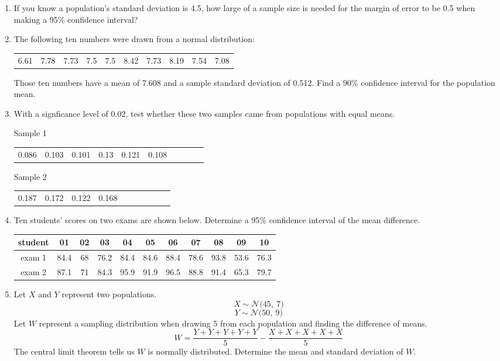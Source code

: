 \documentclass[12pt,letterpaper]{article}
\newcommand{\N}[2]{\mathcal{N}\big(#1,~#2\big)}
\begin{document}
\begin{enumerate}
\item If you know a population's standard deviation is 4.5, how large of a sample size is needed for the margin of error to be 0.5 when making a 95\% confidence interval?
\vfill
\item The following ten numbers were drawn from a normal distribution:
\begin{center}
\begin{tabular}{cccccccccc}
6.61 & 7.78 & 7.73 & 7.5 & 7.5 & 8.42 & 7.73 & 8.19 & 7.54 & 7.08
\end{tabular}
\end{center}
Those ten numbers have a mean of 7.608 and a sample standard deviation of 0.512. Find a 90\% confidence interval for the population mean.
\vfill

\newpage

\item With a signficance level of 0.02, test whether these two samples came from populations with equal means.
\begin{center}
Sample 1\\
\begin{tabular}{cccccccccc}
0.086 & 0.103 & 0.101 & 0.13 & 0.121 & 0.108
\end{tabular}
\end{center}
\begin{center}
Sample 2\\
\begin{tabular}{cccccccccc}
0.187 & 0.172 & 0.122 & 0.168
\end{tabular}
\end{center}

\newpage

\item Ten students' scores on two exams are shown below. Determine a 95\% confidence interval of the mean difference.
\begin{center}
\begin{tabular}{|c|c c c c c c c c c c|} \hline
student & 01 & 02 & 03 & 04 & 05 & 06 & 07 & 08 & 09 & 10 \\ \hline
exam 1 & 84.4 & 68 & 76.2 & 84.4 & 84.6 & 88.4 & 78.6 & 93.8 & 53.6 & 76.3 \\
exam 2 & 87.1 & 71 & 84.3 & 95.9 & 91.9 & 96.5 & 88.8 & 91.4 & 65.3 & 79.7 \\ \hline
\end{tabular}
\end{center}

\newpage

\item Let $X$ and $Y$ represent two populations.
$$X \sim \N{45}{7} $$
$$Y \sim \N{50}{9} $$
Let $W$ represent a sampling distribution when drawing 5 from each population and finding the difference of means.
$$W = \frac{Y+Y+Y+Y+Y}{5} - \frac{X+X+X+X+X}{5} $$
The central limit theorem tells us $W$ is normally distributed. Determine the mean and standard deviation of $W$.

\end{enumerate}
\end{document}
